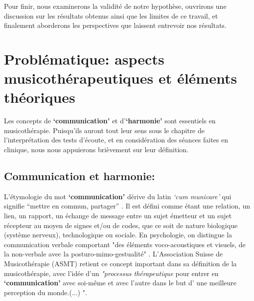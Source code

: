 Pour finir, nous examinerons la validité de notre hypothèse, ouvrirons
une discussion sur les résultats obtenus ainsi que les limites de ce
travail, et finalement aborderons les perspectives que
laissent entrevoir nos résultats.


\chapter{Problématique: aspects musicothérapeutiques et éléments théoriques}
Les concepts de \textbf{`communication'} et  d'\textbf{`harmonie'}
sont essentiels en
musicothérapie. Puisqu'ils auront tout  leur sens sous le chapitre de l'interprétation des tests
d'écoute, et en considération des séances faites en clinique, nous nous appuierons brièvement
sur leur définition. 
\section{Communication et harmonie: }
L'étymologie du mot  \textbf{`communication'} dérive du latin  \textit{`cum
  municare'} qui signifie ``mettre en commun, partager'' \autocite{dicpetitrobert}.
Il est défini comme étant une
relation, un lien, un rapport, un échange de message entre un sujet émetteur et un
sujet récepteur au moyen de signes et/ou de codes, que ce soit de nature biologique (système nerveux), technologique ou sociale. En psychologie, on distingue la communication verbale comportant "des éléments voco-acoustiques et visuels, de la non-verbale avec la posturo-mimo-gestualité" \autocite{doronparot}.
L'Association Suisse
de Musicothérapie (ASMT) retient ce concept important dans sa définition de la musicothérapie, avec l'idée  d'un\textit{ "processus thérapeutique }pour entrer en \textbf{`communication'} avec soi-même et avec
l'autre dans le but d' une meilleure perception du
monde.(...) "\autocite{site_musitherapy}.

